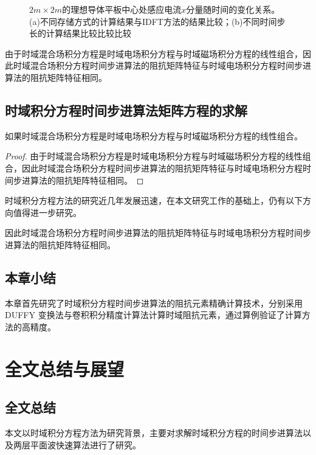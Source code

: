 \documentclass[master]{thesis-uestc}
\begin{document}
\begin{figure}[h]
\caption{$2m\times 2m$的理想导体平板中心处感应电流$x$分量随时间的变化关系。(a)不同存储方式的计算结果与IDFT方法的结果比较；(b)不同时间步长的计算结果比较比较比较}
\label{fig2}
\end{figure}

由于时域混合场积分方程是时域电场积分方程与时域磁场积分方程的线性组合，因此时域混合场积分方程时间步进算法的阻抗矩阵特征与时域电场积分方程时间步进算法的阻抗矩阵特征相同。

\section{时域积分方程时间步进算法矩阵方程的求解}
\begin{theorem}
如果时域混合场积分方程是时域电场积分方程与时域磁场积分方程的线性组合。
\end{theorem}
\begin{proof}
由于时域混合场积分方程是时域电场积分方程与时域磁场积分方程的线性组合，因此时域混合场积分方程时间步进算法的阻抗矩阵特征与时域电场积分方程时间步进算法的阻抗矩阵特征相同。
\end{proof}
\begin{corollary}
时域积分方程方法的研究近几年发展迅速，在本文研究工作的基础上，仍有以下方向值得进一步研究。
\end{corollary}
\begin{lemma}
因此时域混合场积分方程时间步进算法的阻抗矩阵特征与时域电场积分方程时间步进算法的阻抗矩阵特征相同。
\end{lemma}

\section{本章小结}
本章首先研究了时域积分方程时间步进算法的阻抗元素精确计算技术，分别采用DUFFY 变换法与卷积积分精度计算法计算时域阻抗元素，通过算例验证了计算方法的高精度。

\chapter{全文总结与展望}

\section{全文总结}
本文以时域积分方程方法为研究背景，主要对求解时域积分方程的时间步进算法以及两层平面波快速算法进行了研究。
\end{document}
